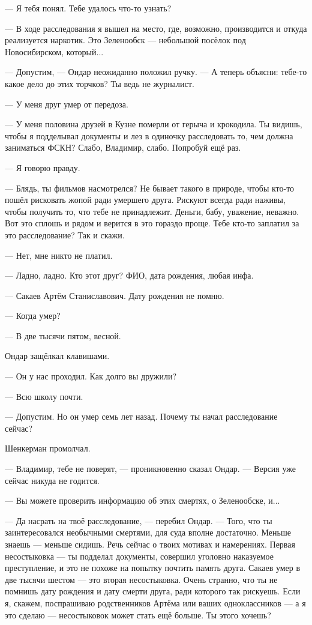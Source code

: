 \documentclass[a4paper,10pt,fleqn]{book}\usepackage{polyglossia}\setdefaultlanguage{english}\setotherlanguage{russian}\defaultfontfeatures{Ligatures=TeX,Mapping=tex-text} \usepackage{xcolor}\definecolor{lightgray}{HTML}{bbbbbb}\color{lightgray}\newcommand{\ml}[3]{\textcolor{black}{#3}}
\begin{document}
--- Я тебя понял.
Тебе удалось что-то узнать?

--- В ходе расследования я вышел на место, где, возможно, производится и откуда реализуется наркотик.
Это Зеленообск --- небольшой посёлок под Новосибирском, который...

--- Допустим, --- Ондар неожиданно положил ручку.
--- А теперь объясни: тебе-то какое дело до этих торчков?
Ты ведь не журналист.

--- У меня друг умер от передоза.

--- У меня половина друзей в Кузне померли от герыча и крокодила.
Ты видишь, чтобы я подделывал документы и лез в одиночку расследовать то, чем должна заниматься ФСКН?
Слабо, Владимир, слабо.
Попробуй ещё раз.

--- Я говорю правду.

--- Блядь, ты фильмов насмотрелся?
Не бывает такого в природе, чтобы кто-то пошёл рисковать жопой ради умершего друга.
Рискуют всегда ради наживы, чтобы получить то, что тебе не принадлежит.
Деньги, бабу, уважение, неважно.
Вот это сплошь и рядом и верится в это гораздо проще.
Тебе кто-то заплатил за это расследование?
Так и скажи.

--- Нет, мне никто не платил.

--- Ладно, ладно.
Кто этот друг?
ФИО, дата рождения, любая инфа.

--- Сакаев Артём Станиславович.
Дату рождения не помню.

--- Когда умер?

--- В две тысячи пятом, весной.

Ондар защёлкал клавишами.

--- Он у нас проходил.
Как долго вы дружили?

--- Всю школу почти.

--- Допустим.
Но он умер семь лет назад.
Почему ты начал расследование сейчас?

Шенкерман промолчал.

--- Владимир, тебе не поверят, --- проникновенно сказал Ондар.
--- Версия уже сейчас никуда не годится.

--- Вы можете проверить информацию об этих смертях, о Зеленообске, и...

--- Да насрать на твоё расследование, --- перебил Ондар.
--- Того, что ты заинтересовался необычными смертями, для суда вполне достаточно.
Меньше знаешь --- меньше сидишь.
Речь сейчас о твоих мотивах и намерениях.
Первая несостыковка --- ты подделал документы, совершил уголовно наказуемое преступление, и это не похоже на попытку почтить память друга.
Сакаев умер в две тысячи шестом --- это вторая несостыковка.
Очень странно, что ты не помнишь дату рождения и дату смерти друга, ради которого так рискуешь.
Если я, скажем, поспрашиваю родственников Артёма или ваших одноклассников --- а я это сделаю --- несостыковок может стать ещё больше.
Ты этого хочешь?
\end{document}
